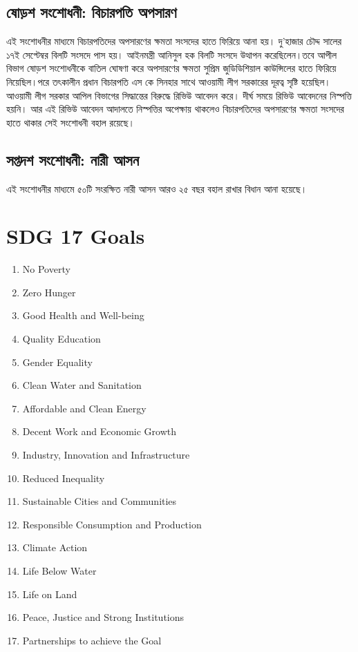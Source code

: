 \documentclass[11pt]{article}
\begin{document}
\subsection{ষোড়শ সংশোধনী: বিচারপতি অপসারণ}
\label{sec:org1772224}
এই সংশোধনীর মাধ্যমে বিচারপতিদের অপসারণের ক্ষমতা সংসদের হাতে
ফিরিয়ে আনা হয়। দু'হাজার চৌদ্দ সালের ১৭ই সেপ্টেম্বর বিলটি সংসদে
পাস হয়। আইনমন্ত্রী আনিসুল হক বিলটি সংসদে উত্থাপন করেছিলেন।তবে
আপীল বিভাগ ষোড়শ সংশোধনীকে বাতিল ঘোষণা করে অপসারণের ক্ষমতা
সুপ্রিম জুডিডিশিয়াল কাউন্সিলের হাতে ফিরিয়ে নিয়েছিল।পরে তৎকালীন
প্রধান বিচারপতি এস কে সিনহার সাথে আওয়ামী লীগ সরকারের দূরত্ব
সৃষ্টি হয়েছিল।আওয়ামী লীগ সরকার আপিল বিভাগের সিদ্ধান্তের বিরুদ্ধে
রিভিউ আবেদন করে। দীর্ঘ সময়ে রিভিউ আবেদনের নিস্পত্তি হয়নি। আর এই
রিভিউ আবেদন আদালতে নিস্পত্তির অপেক্ষায় থাকলেও বিচারপতিদের
অপসারণের ক্ষমতা সংসদের হাতে থাকার সেই সংশোধনী বহাল রয়েছে।

\subsection{সপ্তদশ সংশোধনী: নারী আসন}
\label{sec:org4b22364}
এই সংশোধনীর মাধ্যমে ৫০টি সংরক্ষিত নারী আসন আরও ২৫ বছর বহাল
রাখার বিধান আনা হয়েছে।

\section{SDG 17 Goals}
\label{sec:orgf9eee3e}

\begin{enumerate}
\item No Poverty
\item Zero Hunger
\item Good Health and Well-being
\item Quality Education
\item Gender Equality
\item Clean Water and Sanitation
\item Affordable and Clean Energy
\item Decent Work and Economic Growth
\item Industry, Innovation and Infrastructure
\item Reduced Inequality
\item Sustainable Cities and Communities
\item Responsible Consumption and Production
\item Climate Action
\item Life Below Water
\item Life on Land
\item Peace, Justice and Strong Institutions
\item Partnerships to achieve the Goal
\end{enumerate}
\end{document}

